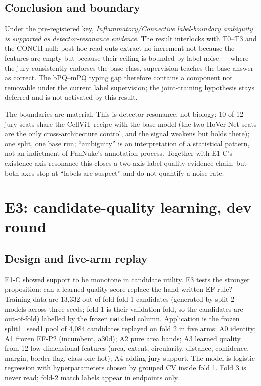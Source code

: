 \documentclass[11pt,a4paper]{article}
\newcommand{\code}[1]{\nolinkurl{#1}}
\begin{document}
\subsection{Conclusion and boundary}

Under the pre-registered key, \emph{Inflammatory/Connective label-boundary ambiguity is supported as detector-resonance evidence}. The result interlocks with T0--T3 and the CONCH null: post-hoc read-outs extract no increment not because the features are empty but because their ceiling is bounded by label noise --- where the jury consistently endorses the base class, supervision teaches the base answer as correct. The bPQ--mPQ typing gap therefore contains a component not removable under the current label supervision; the joint-training hypothesis stays deferred and is not activated by this result.

The boundaries are material. This is detector resonance, not biology: 10 of 12 jury seats share the CellViT recipe with the base model (the two HoVer-Net seats are the only cross-architecture control, and the signal weakens but holds there); one split, one base run; ``ambiguity'' is an interpretation of a statistical pattern, not an indictment of PanNuke's annotation process. Together with E1-C's existence-axis resonance this closes a two-axis label-quality evidence chain, but both axes stop at ``labels are suspect'' and do not quantify a noise rate.

\section{E3: candidate-quality learning, dev round}\label{sec:e3}

\subsection{Design and five-arm replay}

E1-C showed support to be monotone in candidate utility. E3\cite{specs} tests the stronger proposition: can a learned quality score replace the hand-written EF rule? Training data are 13,332 out-of-fold fold-1 candidates (generated by split-2 models across three seeds; fold 1 is their validation fold, so the candidates are out-of-fold) labelled by the frozen \code{matched} column. Application is the frozen split1\_seed1 pool of 4,084 candidates replayed on fold 2 in five arms: A0 identity; A1 frozen EF-P2 (incumbent, a30d); A2 pure area bands; A3 learned quality from 12 low-dimensional features (area, extent, circularity, distance, confidence, margin, border flag, class one-hot); A4 adding jury support. The model is logistic regression with hyperparameters chosen by grouped CV inside fold 1. Fold 3 is never read; fold-2 match labels appear in endpoints only.
\end{document}

